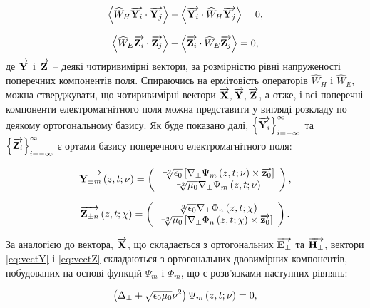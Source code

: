 \begin{equation}
\left< \widehat{W}_H \overrightarrow{\mathbf Y_i} \cdot \overrightarrow{\mathbf Y_j} \right> -
\left< \overrightarrow{\mathbf Y_i} \cdot \widehat{W}_H \overrightarrow{\mathbf Y_j} \right> = 0,
\end{equation}

\begin{equation}
\left< \widehat{W}_E \overrightarrow{\mathbf Z_i} \cdot \overrightarrow{\mathbf Z_j} \right> -
\left< \overrightarrow{\mathbf Z_i} \cdot \widehat{W}_E \overrightarrow{\mathbf Z_j} \right> = 0,
\end{equation}
%
де $ \overrightarrow{\mathbf Y} $ і $ \overrightarrow{\mathbf Z} $ -- деякі чотиривимірні вектори, за розмірністю 
рівні напруженості поперечних компонентів поля. Спираючись на ермітовість 
операторів $ \widehat{W}_H $ і $ \widehat{W}_E $, можна стверджувати, що 
чотиривимірні вектори $ \overrightarrow{\mathbf X}, \overrightarrow{\mathbf Y}, \overrightarrow{\mathbf Z} $, а отже, і всі поперечні 
компоненти електромагнітного поля можна представити у вигляді розкладу по 
деякому ортогональному базису. Як буде показано далі,
$ \left\{ \overrightarrow{\mathbf Y_i} \right\}_{i=-\infty}^\infty $ та 
$ \left\{ \overrightarrow{\mathbf Z_i} \right\}_{i=-\infty}^\infty $ є ортами базису 
поперечного електромагнітного поля:

\begin{equation} \label{eq:vectY}
\overrightarrow{\mathbf Y_{\pm m}} \left( z,t;\nu \right) =
\left( \begin{array}{c} 
\sqrt[-2]{\epsilon_0} 
\left[ \nabla_\perp \Psi_m \left( z,t;\nu \right) \times \overrightarrow{\mathbf z_0} \right] \\ 
\sqrt[-2]{\mu_0} \nabla_\perp \Psi_m \left( z,t;\nu \right) \\ 
\end{array} \right),
\end{equation}

\begin{equation} \label{eq:vectZ}
\overrightarrow{\mathbf Z_{\pm n}} \left( z,t;\chi \right) =
\left( \begin{array}{c} 
\sqrt[-2]{\epsilon_0} \nabla_\perp \Phi_n \left( z,t;\chi \right) \\ 
\sqrt[-2]{\mu_0} \left[ \nabla_\perp \Phi_n \left( z,t;\chi \right) \times \overrightarrow{\mathbf z_0} \right] \\ 
\end{array} \right).
\end{equation}

За аналогією до вектора, $ \overrightarrow{\mathbf X} $, що складається з ортогональних 
$ \overrightarrow{\mathbf E_\perp} $ та $ \overrightarrow{\mathbf H_\perp} $, вектори \eqref{eq:vectY} і 
\eqref{eq:vectZ} складаються з ортогональних двовимірних компонентів, 
побудованих на основі функцій $ \Psi_m $ і $ \Phi_m $, що є розв'язками
наступних рівнянь:

\begin{equation} \label{eq:equation_psi}
\left( \Delta_\perp + \sqrt{\epsilon_0 \mu_0} \nu^2 \right) 
\Psi_m \left( z,t;\nu \right) = 0,
\end{equation}

